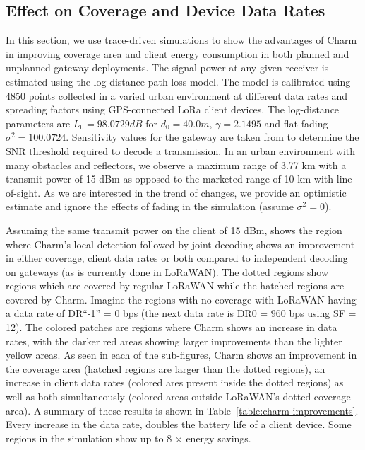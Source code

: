 \subsection{Effect on Coverage and Device Data Rates}
\label{sec:coverage-data-rate-improvement}

In this section, we use trace-driven simulations to show the advantages of
Charm in improving coverage area and client energy consumption in both planned
and unplanned gateway deployments. The signal power at any given receiver is
estimated using the log-distance path loss model. The model is calibrated
using 4850 points collected in a varied urban environment at different data
rates and spreading factors using GPS-connected LoRa client devices. The
log-distance parameters are $L_0  = 98.0729 dB$ for $d_0 = 40.0 m$, $\gamma =
2.1495$ and flat fading $\sigma^2 = 100.0724$. Sensitivity values for the
gateway are taken from \cite{Bor2016} to determine the SNR threshold required
to decode a transmission. In an urban environment with many obstacles and
reflectors, we observe a maximum range of 3.77 km with a transmit power of 15
dBm as opposed to the marketed range of 10 km with line-of-sight. As we are
interested in the trend of changes, we provide an optimistic estimate and
ignore the effects of fading in the simulation (assume $\sigma^2 = 0$).

Assuming the same transmit power on the client of 15 dBm,
 shows the region where Charm's local detection
followed by joint decoding shows an improvement in either coverage, client
data rates or both compared to independent decoding on gateways (as is
currently done in LoRaWAN). 
The dotted regions show regions which are covered by regular LoRaWAN while the
hatched regions are covered by Charm. Imagine the regions with no coverage
with LoRaWAN having a data rate of DR``-1'' = 0 bps (the next data rate is DR0
= 960 bps using SF = 12). The colored patches are regions where Charm shows an
increase in data rates, with the darker red areas showing larger improvements
than the lighter yellow areas. As seen in each of the sub-figures, Charm shows
an improvement in the coverage area (hatched regions are larger than the
dotted regions), an increase in client data rates (colored ares present inside
the dotted regions) as well as both simultaneously (colored areas outside
LoRaWAN's dotted coverage area). A summary of these results is shown in
Table~\ref{table:charm-improvements}. Every increase in the data rate, doubles
the battery life of a client device. Some regions in the simulation show up to
8 $\times$ energy savings.

